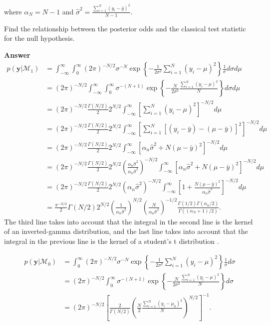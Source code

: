\begin{enumerate}[leftmargin=*]
where $\alpha_N=N-1$ and $\hat{\sigma}^2=\frac{\sum_{i=1}^N (y_i-\bar{y})^2}{N-1}$. 

Find the relationship between the posterior odds and the classical test statistic for the null hypothesis. 

\textbf{Answer}
{\footnotesize{
\begin{align*}
	p(\mathbf{y}|\mathcal{M}_1)&=\int_{-\infty}^{\infty}\int_{0}^{\infty} (2\pi)^{-N/2}\sigma^{-N}\exp\left\{-\frac{1}{2\sigma^2}\sum_{i=1}^N (y_i-\mu)^2\right\}\frac{1}{\sigma}d\sigma d\mu\\
	&=(2\pi)^{-N/2}\int_{-\infty}^{\infty}\int_{0}^{\infty} \sigma^{-(N+1)}\exp\left\{-\frac{N}{2\sigma^2}\frac{\sum_{i=1}^N (y_i-\mu)^2}{N}\right\}d\sigma d\mu\\
	&=(2\pi)^{-N/2}\frac{\Gamma(N/2)}{2}2^{N/2}\int_{-\infty}^{\infty}\left[\sum_{i=1}^N (y_i-\mu)^2\right]^{-N/2}d\mu\\
	&=(2\pi)^{-N/2}\frac{\Gamma(N/2)}{2}2^{N/2}\int_{-\infty}^{\infty}\left[\sum_{i=1}^N [(y_i-\bar{y})-(\mu-\bar{y})]^2\right]^{-N/2}d\mu\\
	&=(2\pi)^{-N/2}\frac{\Gamma(N/2)}{2}2^{N/2}\int_{-\infty}^{\infty}\left[\alpha_n\hat{\sigma}^2+N(\mu-\bar{y})^2\right]^{-N/2}d\mu\\
	&=(2\pi)^{-N/2}\frac{\Gamma(N/2)}{2}2^{N/2}\left(\frac{\alpha_n\hat{\sigma}^2}{\alpha_n\hat{\sigma}^2}\right)^{-N/2}\int_{-\infty}^{\infty}\left[\alpha_n\hat{\sigma}^2+N(\mu-\bar{y})^2\right]^{-N/2}d\mu\\
	&=(2\pi)^{-N/2}\frac{\Gamma(N/2)}{2}2^{N/2}\left(\alpha_n\hat{\sigma}^2\right)^{-N/2}\int_{-\infty}^{\infty}\left[1+\frac{N(\mu-\bar{y})^2}{\alpha_n\hat{\sigma}^2}\right]^{-N/2}d\mu\\
	&=\frac{\pi^{-N/2}}{2}\Gamma(N/2)2^{N/2}\left(\frac{1}{\alpha_n\hat{\sigma}^2}\right)^{N/2}\left(\frac{N}{\alpha_n\hat{\sigma}^2}\right)^{-1/2}\frac{\Gamma(1/2)\Gamma(\alpha_n/2)}{\Gamma((\alpha_N+1)/2)}.
\end{align*} 
}}
The third line takes into account that the integral in the second line is the kernel of an inverted-gamma distribution, and the last line takes into account that the integral in the previous line is the kernel of a student's t distribution \cite{zellner1996introduction}.


\begin{align*}
	p(\mathbf{y}|\mathcal{M}_0)&=\int_{0}^{\infty} (2\pi)^{-N/2}\sigma^{-N}\exp\left\{-\frac{1}{2\sigma^2}\sum_{i=1}^N (y_i-\mu)^2\right\}\frac{1}{\sigma}d\sigma \\
	&=(2\pi)^{-N/2}\int_{0}^{\infty} \sigma^{-(N+1)}\exp\left\{-\frac{N}{2\sigma^2}\frac{\sum_{i=1}^N (y_i-\mu)^2}{N}\right\}d\sigma \\
	&=(2\pi)^{-N/2}\left[\frac{2}{\Gamma(N/2)}\left(\frac{N}{2}\frac{\sum_{i=1}^N(y_i-\mu_0)^2}{N}\right)^{N/2}\right]^{-1}.
\end{align*} 


\end{enumerate}
